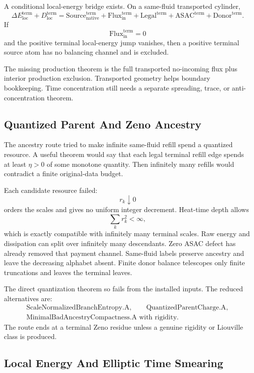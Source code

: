 A conditional local-energy bridge exists.
On a same-fluid transported cylinder,
\[
  \Delta E_{\mathrm{loc}}^{\mathrm{term}}
  +D_{\mathrm{loc}}^{\mathrm{term}}
  =
  \mathrm{Source}_{\mathrm{native}}^{\mathrm{term}}
  +\mathrm{Flux}_{\mathrm{in}}^{\mathrm{term}}
  +\mathrm{Legal}^{\mathrm{term}}
  +\mathrm{ASAC}^{\mathrm{term}}
  +\mathrm{Donor}^{\mathrm{term}} .
\]
If
\[
  \mathrm{Flux}_{\mathrm{in}}^{\mathrm{term}}=0
\]
and the positive terminal local-energy jump vanishes, then a positive terminal
source atom has no balancing channel and is excluded.

The missing production theorem is the full transported no-incoming flux plus
interior production exclusion.
Transported geometry helps boundary bookkeeping.
Time concentration still needs a separate spreading, trace, or
anti-concentration theorem.

\subsection{Quantized Parent And Zeno Ancestry}

The ancestry route tried to make infinite same-fluid refill spend a quantized
resource.
A useful theorem would say that each legal terminal refill edge spends at least
\(\eta>0\) of some monotone quantity.
Then infinitely many refills would contradict a finite original-data budget.

Each candidate resource failed:
\[
  r_k\downarrow0
\]
orders the scales and gives no uniform integer decrement.
Heat-time depth allows
\[
  \sum_k r_k^2<\infty ,
\]
which is exactly compatible with infinitely many terminal scales.
Raw energy and dissipation can split over infinitely many descendants.
Zero ASAC defect has already removed that payment channel.
Same-fluid labels preserve ancestry and leave the decreasing alphabet absent.
Finite donor balance telescopes only finite truncations and leaves the terminal
leaves.

The direct quantization theorem so fails from the installed inputs.
The reduced alternatives are:
\[
  \begin{gathered}
  \text{ScaleNormalizedBranchEntropy.A},\qquad
  \text{QuantizedParentCharge.A},\\
  \text{MinimalBadAncestryCompactness.A with rigidity}.
  \end{gathered}
\]
The route ends at a terminal Zeno residue unless a genuine rigidity or Liouville
class is produced.

\subsection{Local Energy And Elliptic Time Smearing}

